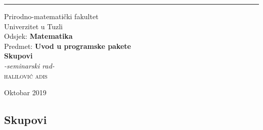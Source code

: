 \documentclass[a4paper, 14pt]{article}
\begin{document}
\begin{titlepage}
\raggedright
\rule{1pt}{\textheight}
\hspace{0.05\textwidth}
\parbox[b]{0.75\textwidth}{

{\large{Prirodno-matematički fakultet\\
Univerzitet u Tuzli\\
Odsjek: \textbf{Matematika}\\
Predmet: \textbf{Uvod u programske pakete}}}\\[7\baselineskip]
{\Huge\bfseries Skupovi}\\[1\baselineskip]
{\large\textit{-seminarski rad-}}\\[5\baselineskip]
{\Large\textsc{halilović adis}}

\vspace{0.5\textheight}

{\noindent Oktobar 2019}\\[\baselineskip]
}
\end{titlepage}

\begin{tcolorbox}
\tableofcontents
\end{tcolorbox}
\thispagestyle{empty}
\newpage

\begin{minipage}{0.35\textwidth}
\begin{tcolorbox}
\section{Skupovi}
\end{tcolorbox}
\end{minipage}
\begin{minipage}{0.65\textwidth}
\hfill
\end{minipage}
\end{document}
